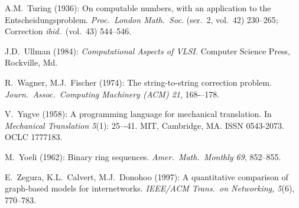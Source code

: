 \begin{thebibliography}{999}
A.M.~Turing (1936): On computable numbers, with an application to the
Entscheidungsproblem.  {\it Proc.~London Math.~Soc.} (ser.~2, vol.~42)
230--265; Correction {\it ibid.}~(vol.~43) 544--546.


J.D.~Ullman (1984):
{\it Computational Aspects of VLSI.}
Computer Science Press, Rockville, Md.



R.~Wagner, M.J.~Fischer (1974):
The string-to-string correction problem.
{\it Journ.~Assoc.~Computing Machinery (ACM) 21}, 168-–178.


V.~Yngve (1958): 
A programming language for mechanical translation.
In {\it Mechanical Translation 5}(1): 25–-41.  MIT, Cambridge, MA.
ISSN 0543-2073. OCLC 1777183.

M.~Yoeli (1962): Binary ring sequences.  {\it Amer.~Math.~Monthly 69},
852--855.


E.~Zegura, K.L.~Calvert, M.J.~Donohoo (1997):
A quantitative comparison of graph-based models for internetworks.
{\it IEEE/ACM Trans.~on Networking, 5}(6), 770--783.
\end{thebibliography}

